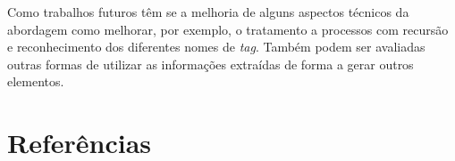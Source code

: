 \documentclass[12pt]{article}
\begin{document}
Como trabalhos futuros têm se a melhoria de alguns aspectos técnicos da abordagem como melhorar, por exemplo, o tratamento a processos com recursão e reconhecimento dos diferentes nomes de \emph{tag}. Também podem ser avaliadas outras formas de utilizar as informações extraídas de forma a gerar outros elementos.
 

\section{Referências}



\end{document}
